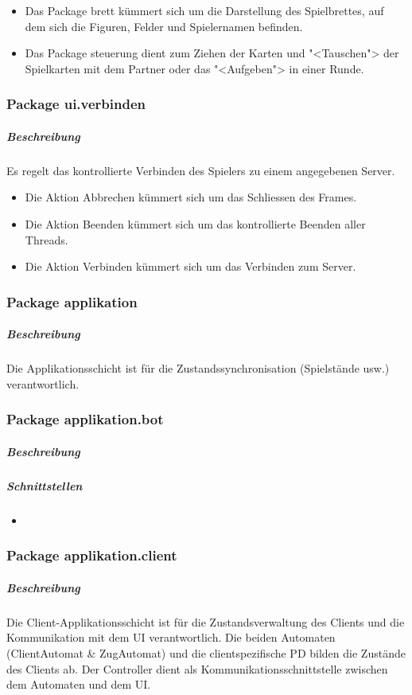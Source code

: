 \documentclass[12pt,halfparskip]{scrartcl}
\begin{document}
\begin{itemize}
	\item Das Package brett kümmert sich um die Darstellung des Spielbrettes, auf dem sich die Figuren, Felder und Spielernamen befinden.
	\item Das Package steuerung dient zum Ziehen der Karten und "<Tauschen"> der Spielkarten mit dem Partner oder das "<Aufgeben"> in einer Runde.
\end{itemize}

\subsubsection{Package ui.verbinden}
\label{ssub:package_ui_verbinden}
\subparagraph{Beschreibung}
Es regelt das kontrollierte Verbinden des Spielers zu einem angegebenen Server.

\begin{itemize}
	\item Die Aktion Abbrechen kümmert sich um das Schliessen des Frames.
	\item Die Aktion Beenden kümmert sich um das kontrollierte Beenden aller Threads.
	\item Die Aktion Verbinden kümmert sich um das Verbinden zum Server.
\end{itemize}

\clearpage
\subsubsection{Package applikation}
	\subparagraph{Beschreibung}
	Die Applikationsschicht ist für die Zustandssynchronisation (Spielstände usw.) verantwortlich.

\subsubsection{Package applikation.bot}
	\subparagraph{Beschreibung}

	\subparagraph{Schnittstellen}
	\begin{itemize}
		\item 
	\end{itemize}
	
\subsubsection{Package applikation.client}
	\subparagraph{Beschreibung}
	Die Client-Applikationsschicht ist für die Zustandsverwaltung des Clients und die Kommunikation mit dem UI verantwortlich. Die beiden Automaten (ClientAutomat \& ZugAutomat) und die clientspezifische PD bilden die Zustände des Clients ab. Der Controller dient als Kommunikationsschnittstelle zwischen dem Automaten und dem UI.
	
\end{document}
